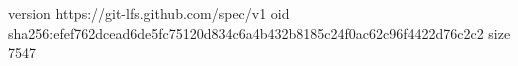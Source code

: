 version https://git-lfs.github.com/spec/v1
oid sha256:efef762dcead6de5fc75120d834c6a4b432b8185c24f0ac62c96f4422d76c2c2
size 7547
